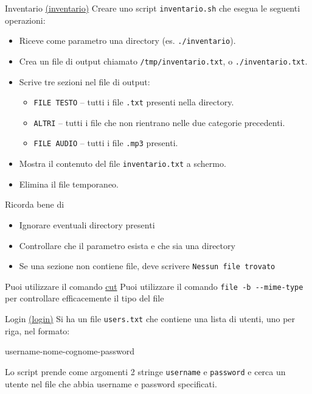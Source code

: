 \begin{esercizio}{Inventario \href{run:./files/linux/inventario/}{(inventario)}}
	Creare uno script \texttt{inventario.sh} che esegua le seguenti operazioni:
	\begin{itemize}
		\item Riceve come parametro una directory (es. \texttt{./inventario}).
		\item Crea un file di output chiamato \texttt{/tmp/inventario.txt}, o \texttt{./inventario.txt}.
		\item Scrive tre sezioni nel file di output:
		      \begin{itemize}
			      \item \texttt{FILE TESTO} – tutti i file \texttt{.txt} presenti nella directory.
			      \item \texttt{ALTRI} – tutti i file che non rientrano nelle due categorie precedenti.
			      \item \texttt{FILE AUDIO} – tutti i file \texttt{.mp3} presenti.
		      \end{itemize}
		\item Mostra il contenuto del file \texttt{inventario.txt} a schermo.
		\item Elimina il file temporaneo.
	\end{itemize}
	Ricorda bene di
	\begin{itemize}
		\item Ignorare eventuali directory presenti
		\item Controllare che il parametro esista e che sia una directory
		\item Se una sezione non contiene file, deve scrivere \verb|Nessun file trovato|
	\end{itemize}
	Puoi utilizzare il comando \hyperref[cut command]{cut}
	\vskip3mm
	Puoi utilizzare il comando \verb|file -b --mime-type| per controllare efficacemente il tipo del file
\end{esercizio}

\begin{esercizio}{Login \href{run:./files/linux/login/}{(login)}}
	Si ha un file \texttt{users.txt} che contiene una lista di utenti, uno per riga, nel formato:
	\begin{center}
		\ttfamily
		username-nome-cognome-password
	\end{center}
	Lo script prende come argomenti 2 stringe \verb|username| e \verb|password| e cerca un utente nel file che abbia username e password specificati.
\end{esercizio}



